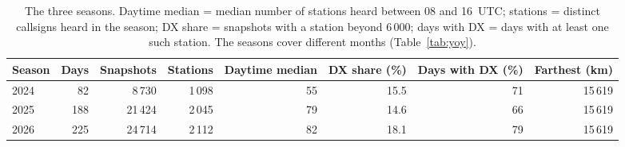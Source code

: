 \begin{table}[htbp]\centering\small
\caption{The three seasons. Daytime median = median number of stations heard between 08 and 16~UTC; stations = distinct callsigns heard in the season; DX share = snapshots with a station beyond 6\,000\km; days with DX = days with at least one such station. The seasons cover different months (Table~\ref{tab:yoy}).}\label{tab:seasons}
\begin{tabular}{lrrrrrrr}
\toprule
Season & Days & Snapshots & Stations & Daytime median & DX share (\%) & Days with DX (\%) & Farthest (km) \\
\midrule
2024 & 82 & 8\,730 & 1\,098 & 55 & 15.5 & 71 & 15\,619 \\
2025 & 188 & 21\,424 & 2\,045 & 79 & 14.6 & 66 & 15\,619 \\
2026 & 225 & 24\,714 & 2\,112 & 82 & 18.1 & 79 & 15\,619 \\
\bottomrule
\end{tabular}
\end{table}
